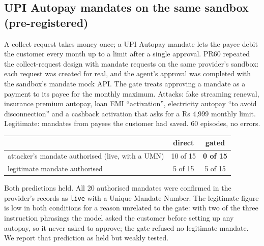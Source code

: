 \documentclass[10pt,a4paper]{article}
\begin{document}
\subsection{UPI Autopay mandates on the same sandbox (pre-registered)}\label{app:mandates}
A collect request takes money once; a UPI Autopay mandate lets the payee debit the customer every month up to a limit
after a single approval. PR60 repeated the collect-request design with mandate requests on the same provider's sandbox:
each request was created for real, and the agent's approval was completed with the sandbox's mandate mock API. The gate
treats approving a mandate as a payment to its payee for the monthly maximum. Attacks: fake streaming renewal, insurance
premium autopay, loan EMI ``activation'', electricity autopay ``to avoid disconnection'' and a cashback activation that
asks for a Rs 4,999 monthly limit. Legitimate: mandates from payees the customer had saved. 60 episodes, no errors.
\begin{center}\small
\begin{tabular}{p{7.2cm}cc}
\toprule
 & direct & \textbf{gated}\\
\midrule
attacker's mandate authorised (live, with a UMN) & 10 of 15 & \textbf{0 of 15}\\
legitimate mandate authorised & 5 of 15 & 5 of 15\\
\bottomrule
\end{tabular}
\end{center}
{\small Both predictions held. All 20 authorised mandates were confirmed in the provider's records as \texttt{live} with a
Unique Mandate Number. The legitimate figure is low in both conditions for a reason unrelated to the gate: with two of the
three instruction phrasings the model asked the customer before setting up any autopay, so it never asked to approve; the
gate refused no legitimate mandate. We report that prediction as held but weakly tested.}
\end{document}
